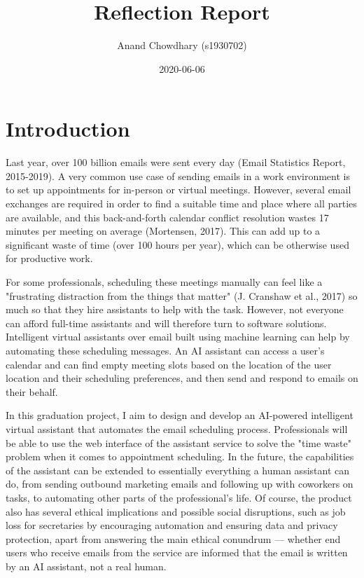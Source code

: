 \documentclass{article}
\title{Reflection Report}
\date{2020-06-06}
\author{Anand Chowdhary (s1930702)}
\begin{document}
  \maketitle
  \newpage

\section{Introduction}

Last year, over 100 billion emails were sent every day (Email Statistics Report, 2015-2019). A very common use case of sending emails in a work environment is to set up appointments for in-person or virtual meetings. However, several email exchanges are required in order to find a suitable time and place where all parties are available, and this back-and-forth calendar conflict resolution wastes 17 minutes per meeting on average (Mortensen, 2017). This can add up to a significant waste of time (over 100 hours per year), which can be otherwise used for productive work.

For some professionals, scheduling these meetings manually can feel like a "frustrating distraction from the things that matter" (J. Cranshaw et al., 2017) so much so that they hire assistants to help with the task. However, not everyone can afford full-time assistants and will therefore turn to software solutions. Intelligent virtual assistants over email built using machine learning can help by automating these scheduling messages. An AI assistant can access a user’s calendar and can find empty meeting slots based on the location of the user location and their scheduling preferences, and then send and respond to emails on their behalf.

In this graduation project, I aim to design and develop an AI-powered intelligent virtual assistant that automates the email scheduling process. Professionals will be able to use the web interface of the assistant service to solve the "time waste" problem when it comes to appointment scheduling. In the future, the capabilities of the assistant can be extended to essentially everything a human assistant can do, from sending outbound marketing emails and following up with coworkers on tasks, to automating other parts of the professional’s life. Of course, the product also has several ethical implications and possible social disruptions, such as job loss for secretaries by encouraging automation and ensuring data and privacy protection, apart from answering the main ethical conundrum — whether end users who receive emails from the service are informed that the email is written by an AI assistant, not a real human.
\end{document}
